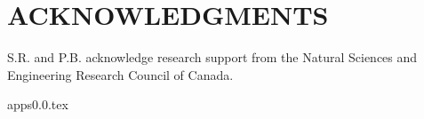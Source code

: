\documentclass[useAMS,usenatbib]{mn2e}
\begin{document}
\section*{ACKNOWLEDGMENTS}
S.R. and P.B. acknowledge research support from the Natural Sciences and Engineering Research Council of Canada. 



{apps0.0.tex}
\end{document}
